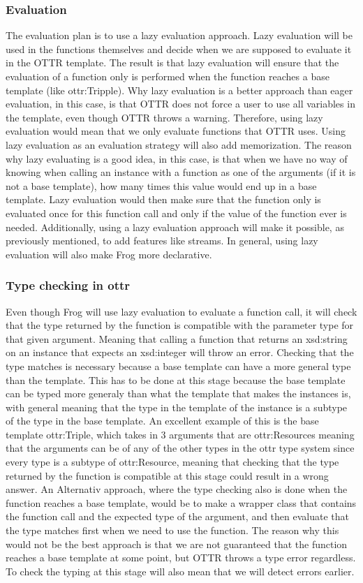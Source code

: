 \subsubsection{Evaluation}
The evaluation plan is to use a lazy evaluation approach. Lazy evaluation will be used in the functions themselves and decide when we are supposed to evaluate it in the OTTR template. The result is that lazy evaluation will ensure that the evaluation of a function only is performed when the function reaches a base template (like ottr:Tripple). Why lazy evaluation is a better approach than eager evaluation, in this case, is that OTTR does not force a user to use all variables in the template, even though OTTR throws a warning. Therefore, using lazy evaluation would mean that we only evaluate functions that OTTR uses. Using lazy evaluation as an evaluation strategy will also add memorization. The reason why lazy evaluating is a good idea, in this case, is that when we have no way of knowing when calling an instance with a function as one of the arguments (if it is not a base template), how many times this value would end up in a base template. Lazy evaluation would then make sure that the function only is evaluated once for this function call and only if the value of the function ever is needed. Additionally, using a lazy evaluation approach will make it possible, as previously mentioned, to add features like streams. In general, using lazy evaluation will also make Frog more declarative.  

\subsubsection{Type checking in ottr}
Even though Frog will use lazy evaluation to evaluate a function call, it will check that the type returned by the function is compatible with the parameter type for that given argument. Meaning that calling a function that returns an xsd:string on an instance that expects an xsd:integer will throw an error. Checking that the type matches is necessary because a base template can have a more general type than the template.  This has to be done at this stage because the base template can be typed more generaly than what the template that makes the instances is, with general meaning that the type in the template of the instance is a subtype of the type in the base template. An excellent example of this is the base template ottr:Triple, which takes in 3 arguments that are ottr:Resources meaning that the arguments can be of any of the other types in the ottr type system since every type is a subtype of ottr:Resource, meaning that checking that the type returned by the function is compatible at this stage could result in a wrong answer. An Alternativ approach, where the type checking also is done when the function reaches a base template, would be to make a wrapper class that contains the function call and the expected type of the argument, and then evaluate that the type matches first when we need to use the function. The reason why this would not be the best approach is that we are not guaranteed that the function reaches a base template at some point, but OTTR throws a type error regardless. To check the typing at this stage will also mean that we will detect errors earlier.

